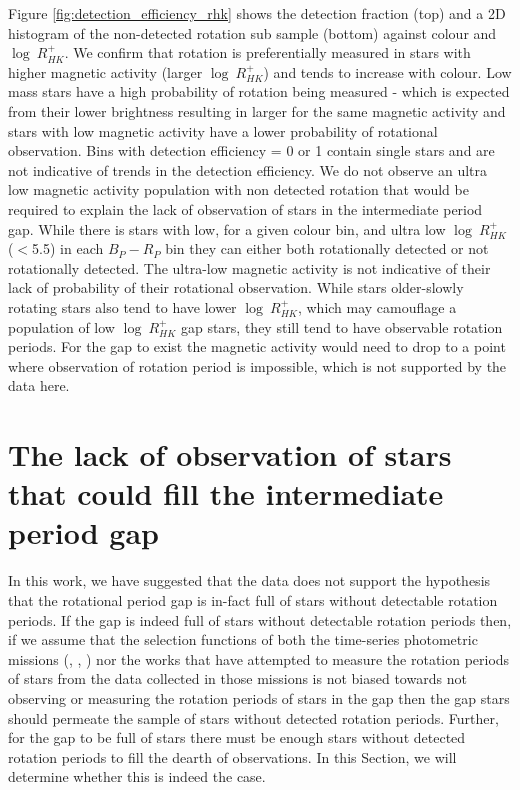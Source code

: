 Figure \ref{fig:detection_efficiency_rhk} shows the detection fraction (top) and a 2D histogram of the non-detected rotation sub sample (bottom) against colour and $\log \ R^{+}_{HK}$. 
We confirm that rotation is preferentially measured in stars with higher magnetic activity (larger $\log \ R^{+}_{HK}$) and tends to increase with colour. 
Low mass stars have a high probability of rotation being measured - which is expected from their lower brightness resulting in larger \rper{} for the same magnetic activity and stars with low magnetic activity have a lower probability of rotational observation. 
Bins with detection efficiency = 0 or 1 contain single stars and are not indicative of trends in the detection efficiency.
We do not observe an ultra low magnetic activity population with non detected rotation that would be required to explain the lack of observation of stars in the intermediate period gap.
While there is stars with low, for a given colour bin, and ultra low $\log \ R^{+}_{HK}$  ($<$5.5) in each $B_P-R_P$ bin they can either both rotationally detected or not rotationally detected. 
The ultra-low magnetic activity is not indicative of their lack of probability of their rotational observation.
While stars older-slowly rotating stars also tend to have lower $\log \ R^{+}_{HK}$, which may camouflage a population of low $\log \ R^{+}_{HK}$ gap stars, they still tend to have observable rotation periods.
For the gap to exist the magnetic activity would need to drop to a point where observation of rotation period is impossible, which is not supported by the data here.


\section{The lack of observation of stars that could fill the intermediate period gap}
\label{sec:no_gap_stars}


In this work, we have suggested that the data does not support the hypothesis that the rotational period gap is in-fact full of stars without detectable rotation periods.
If the gap is indeed full of stars without detectable rotation periods then, if we assume that the selection functions of both the time-series photometric missions (\kepler{}, \ktoo{}, \tess) nor the works that have attempted to measure the rotation periods of stars from the data collected in those missions is not biased towards not observing or measuring the rotation periods of stars in the gap then the gap stars should permeate the sample of stars without detected rotation periods.
Further, for the gap to be full of stars there must be enough stars without detected rotation periods to fill the dearth of observations.
In this Section, we will determine whether this is indeed the case.

